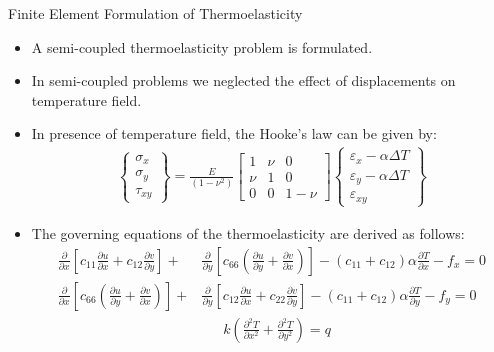 \documentclass{beamer}
\begin{document}
\begin{frame}[t,fragile]{Finite Element Formulation of Thermoelasticity}
    \vspace{-.4cm}
    \begin{itemize}     
\item A semi-coupled thermoelasticity problem is formulated.     
\item In semi-coupled problems we neglected the effect of displacements on temperature field.     
\item In presence of temperature field, the Hooke's law can be given by: 
    \footnotesize
\begin{align*}
    \begin{Bmatrix}
        \sigma_{x}\\ \sigma_{y}\\ \tau_{xy} 
    \end{Bmatrix} =\frac{E}{(1-\nu^2)}
    \begin{bmatrix}
        1 & \nu & 0 \\ \nu & 1 & 0 \\ 0 & 0 & 1-\nu 
    \end{bmatrix}
    \begin{Bmatrix}
        \varepsilon_{x}-\alpha\Delta T \\ \varepsilon_{y}-\alpha \Delta T \\ \varepsilon_{xy} 
    \end{Bmatrix}
\end{align*}
    \item The governing equations of the thermoelasticity are derived as follows: 
            \bgroup
            \begin{align*}
    \frac{\partial}{\partial x}\left[c_{11}\frac{\partial u}{\partial x}+c_{12}\frac{\partial v}{\partial y}\right]+&\frac{\partial}{\partial y}\left[c_{66}\left(\frac{\partial u}{\partial y}+\frac{\partial v}{\partial x}\right)\right]-(c_{11}+c_{12})\alpha\frac{\partial T}{\partial x}-f_x   =0 \\
    \frac{\partial}{\partial x}\left[c_{66}\left(\frac{\partial u}{\partial y}+\frac{\partial v}{\partial x}\right)\right]+&\frac{\partial}{\partial y}\left[c_{12}\frac{\partial u}{\partial x}+c_{22}\frac{\partial v}{\partial y}\right]-(c_{11}+c_{12})\alpha\frac{\partial T}{\partial y}-f_y=0\\
    &\ \ \ \ \ \ \ k\left( \frac{\partial^2 T}{\partial x^2}+\frac{\partial^2 T}{\partial y^2} \right)=q
\end{align*}
\egroup
       \end{itemize}
\end{frame}
\end{document}
